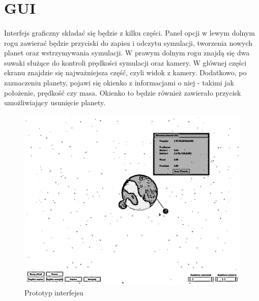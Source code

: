 \section{GUI}\label{sec:gui}

\paragraph{}

Interfejs graficzny składać się będzie z kilku części. Panel opcji w lewym dolnym rogu zawierać będzie przyciski do zapisu i odczytu symulacji, tworzenia nowych planet oraz wstrzymywania symulacji. W prawym dolnym rogu znajdą się dwa suwaki służące do kontroli prędkości symulacji oraz kamery. W głównej części ekranu znajdzie się najważniejsza część, czyli widok z kamery. Dodatkowo, po zaznaczeniu planety, pojawi się okienko z informacjami o niej - takimi jak położenie, prędkość czy masa. Okienko to będzie również zawierało przycisk umożliwiający usunięcie planety.

\begin{figure}[h]
	\centering
	\includegraphics[width=1.0\textwidth]{gui.png}
	\caption{Prototyp interfejsu}
	\label{fig:gui}
\end{figure}

